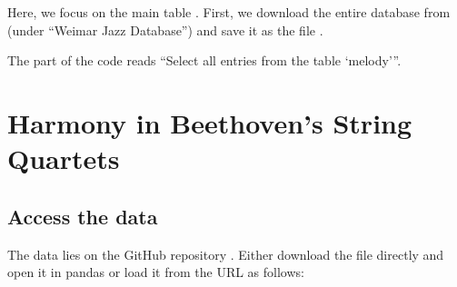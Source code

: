 \documentclass[letterpaper,10pt,english]{sphinxmanual}
\begin{document}
Here, we focus on the main table . First, we download the entire database from 
(under “Weimar Jazz Database”) and save it as the file .

\begin{sphinxVerbatim}[commandchars=\\\{\}]
  
    

  

   

\end{sphinxVerbatim}

\begin{sphinxVerbatim}[commandchars=\\\{\}]
\end{sphinxVerbatim}

The part of the code  reads “Select all entries from the table ‘melody’”.


\chapter{Harmony in Beethoven’s String Quartets}
\label{\detokenize{beethoven_harmony:harmony-in-beethoven-s-string-quartets}}\label{\detokenize{beethoven_harmony::doc}}

\section{Access the data}
\label{\detokenize{beethoven_harmony:access-the-data}}
The data lies on the GitHub repository .
Either download the  file directly and open it in pandas or load it from the URL as follows:
\end{document}

